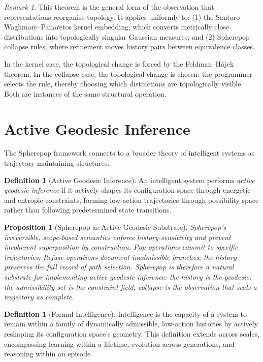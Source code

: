 \documentclass[12pt, a4paper, openany]{book}
\theoremstyle{plain}
\newtheorem{proposition}[theorem]{Proposition}
\theoremstyle{definition}
\newtheorem{definition}[theorem]{Definition}
\theoremstyle{remark}
\newtheorem{remark}[theorem]{Remark}
\begin{document}
\begin{remark}
This theorem is the general form of the observation that representations
reorganise topology. It applies uniformly to:
(1) the Santoro--Waghmare--Panaretos kernel embedding, which converts metrically
close distributions into topologically singular Gaussian measures; and
(2) Spherepop collapse rules, where refinement moves history pairs between
equivalence classes.

In the kernel case, the topological change is forced by the Feldman--H\'ajek
theorem. In the collapse case, the topological change is chosen: the programmer
selects the rule, thereby choosing which distinctions are topologically visible.
Both are instances of the same structural operation.
\end{remark}

\section{Active Geodesic Inference}

The Spherepop framework connects to a broader theory of intelligent systems as
trajectory-maintaining structures.

\begin{definition}[Active Geodesic Inference]
An intelligent system performs \emph{active geodesic inference} if it actively
shapes its configuration space through energetic and entropic constraints, forming
low-action trajectories through possibility space rather than following
predetermined state transitions.
\end{definition}

\begin{proposition}[Spherepop as Active Geodesic Substrate]
Spherepop's irreversible, scope-based semantics enforce history-sensitivity and
prevent incoherent superposition by construction. Pop operations commit to
specific trajectories; Refuse operations document inadmissible branches; the
history preserves the full record of path selection. Spherepop is therefore a
natural substrate for implementing active geodesic inference: the history is the
geodesic; the admissibility set is the constraint field; collapse is the
observation that seals a trajectory as complete.
\end{proposition}

\begin{definition}[Formal Intelligence]
Intelligence is the capacity of a system to remain within a family of dynamically
admissible, low-action histories by actively reshaping its configuration space's
geometry. This definition extends across scales, encompassing learning within a
lifetime, evolution across generations, and reasoning within an episode.
\end{definition}
\end{document}
